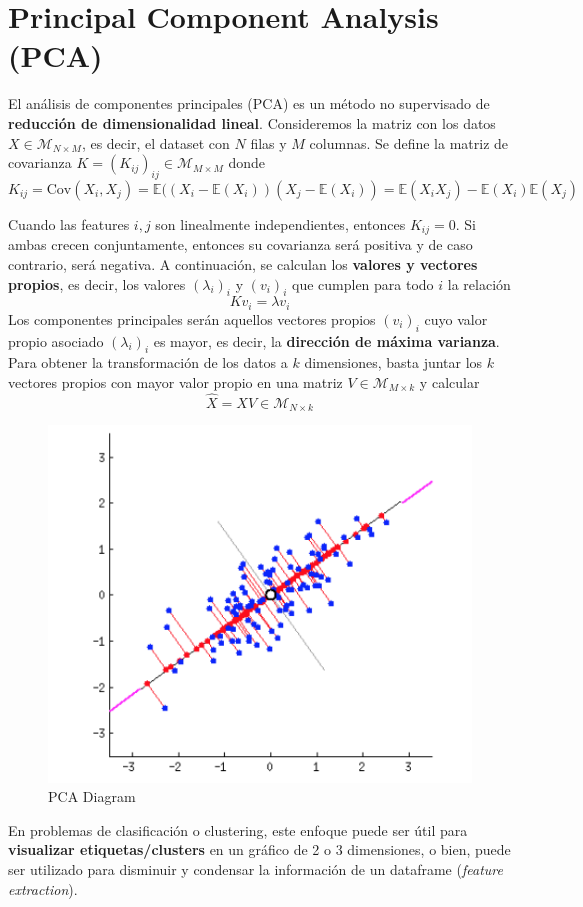 \section{Principal Component Analysis (PCA)}

El análisis de componentes principales (PCA) es un método no supervisado de \textbf{reducción de dimensionalidad lineal}. Consideremos la matriz con los datos $X \in \mathcal{M}_{N \times M}$, es decir, el dataset con $N$ filas y $M$ columnas. Se define la matriz de covarianza $K = (K_{ij})_{ij} \in \mathcal{M}_{M \times M}$ donde  
$$K_{ij} = \text{Cov}(X_i, X_j) = \mathbb{E}((X_i - \mathbb{E}(X_i))(X_j - \mathbb{E}(X_i)) = \mathbb{E}(X_iX_j) - \mathbb{E}(X_i)\mathbb{E}(X_j)$$

Cuando las features $i,j$ son linealmente independientes, entonces $K_{ij} = 0$. Si ambas crecen conjuntamente, entonces su covarianza será positiva y de caso contrario, será negativa. A continuación, se calculan los \textbf{valores y vectores propios}, es decir, los valores $(\lambda_i)_i$ y $(v_i)_i$ que cumplen para todo $i$ la relación 
$$
K v_i = \lambda v_i 
$$
Los componentes principales serán aquellos vectores propios $(v_i)_i$ cuyo valor propio asociado $(\lambda_i)_i$ es mayor, es decir, la \textbf{dirección de máxima varianza}. Para obtener la transformación de los datos a $k$ dimensiones, basta juntar los $k$ vectores propios con mayor valor propio en una matriz $V \in \mathcal{M}_{M \times k}$ y calcular 
$$ 
\hat{X} = XV \in \mathcal{M}_{N \times k}
$$
\begin{figure}[H]
    \center
    \includegraphics[scale=0.9]{notebooks/ML/img/pca_diagram.png}
    \caption{PCA Diagram}
\end{figure}
En problemas de clasificación o clustering, este enfoque puede ser útil para \textbf{visualizar etiquetas/clusters} en un gráfico de 2 o 3 dimensiones, o bien, puede ser utilizado para disminuir y condensar la información de un dataframe (\textit{feature extraction}). 

